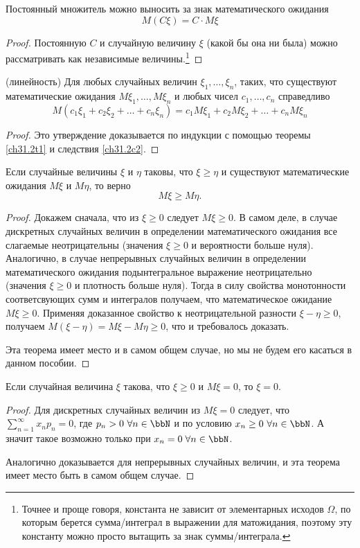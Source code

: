 \begin{cons}\label{ch31.2c2}
Постоянный множитель можно выносить за знак математического ожидания
$$
M(C\xi)=C\cdot M\xi
$$
\end{cons}
\begin{proof}
Постоянную $C$ и случайную величину $\xi$ (какой бы она ни была) можно рассматривать как независимые величины.\footnote{Точнее и проще говоря, константа не зависит от элементарных исходов $\Omega$, по которым берется сумма/интеграл в выражении для матожидания, поэтому эту константу можно просто вытащить за знак суммы/интеграла.}
\end{proof}
\begin{cons}(линейность) Для любых случайных величин $\xi_1,\dots,\xi_n$, таких, что существуют математические ожидания $M\xi_1,\dots, M\xi_n$ и любых чисел $c_1,\dots, c_n$ справедливо
$$
M(c_1\xi_1+c_2\xi_2+\dots+c_n\xi_n) = c_1M\xi_1+c_2M\xi_2+\dots+c_nM\xi_n
$$
\end{cons}
\begin{proof} Это утверждение доказывается по индукции с помощью теоремы \ref{ch31.2t1} и следствия \ref{ch31.2c2}.
\end{proof}
\begin{thm}[монотонность] \label{ch31.2t4}
Если случайные величины $\xi$ и $\eta$ таковы, что $\xi \ge\eta$ и существуют математические ожидания $M\xi$ и $M\eta$, то верно
$$
M\xi\ge M\eta.
$$
\end{thm}
\begin{proof}
Докажем сначала, что из $\xi\ge 0$ следует $M\xi\ge0$. В самом деле, в случае дискретных случайных величин в определении математического ожидания все слагаемые неотрицательны (значения $\xi \ge 0$ и вероятности больше нуля). Аналогично, в случае непрерывных случайных величин в определении математического ожидания подынтегральное выражение неотрицательно (значения $\xi \ge 0$ и плотность больше нуля). Тогда в силу свойства монотонности соответсвующих сумм и интегралов получаем, что математическое ожидание $M\xi \ge 0$. Применяя доказанное свойство к неотрицательной разности $\xi-\eta \ge 0$, получаем $M(\xi-\eta)=M\xi-M\eta\ge0$, что и требовалось доказать.

Эта теорема имеет место и в самом общем случае, но мы не будем его касаться в данном пособии.
\end{proof}
\begin{thm}\label{ch31.2t3}
Если случайная величина $\xi$ такова, что $\xi\ge 0$ и $M\xi=0$, то $\xi=0$.
\end{thm}
\begin{proof}
Для дискретных случайных величин из $M\xi=0$ следует, что $\sum\limits_{n=1}^{\infty} x_n p_n = 0$, где $p_n > 0 \ \forall n\in \bbN$ и по условию $x_n \ge 0 \ \forall n\in \bbN$. А значит такое возможно только при $x_n = 0 \; \forall n\in \bbN$.

Аналогично доказывается для непрерывных случайных величин, и эта теорема имеет место быть в самом общем случае.
\end{proof}

